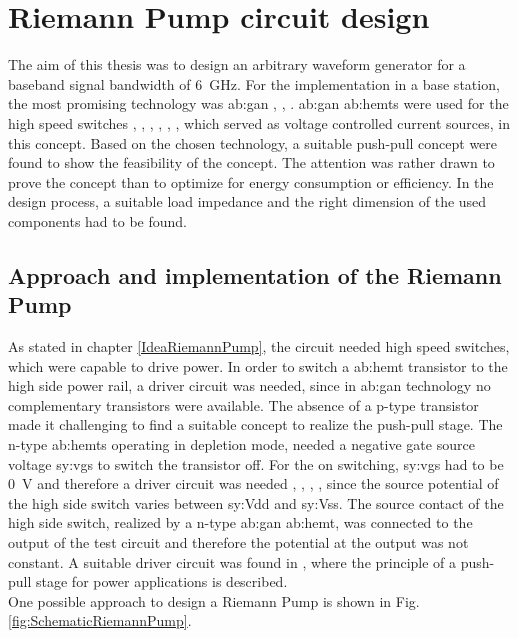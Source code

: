 \chapter{Riemann Pump circuit design}
\label{ch:design}
The aim of this thesis was to design an arbitrary waveform generator for a baseband signal bandwidth of \SI{6}{\giga \hertz}.
For the implementation in a base station, the most promising technology was \gls{ab:gan} \cite{EvertsDasKeybusJ.EtAl2010}, \cite{PengellyWoodMilliganEtAl2012}, \cite{SchmidReberChartierEtAl2011}.
\gls{ab:gan} \glspl{ab:hemt} were used for the high speed switches  \cite{MaroldtHauptKieferEtAl2009}, \cite{HongMukaiGheidiEtAl2013}, \cite{MaroldtBruecknerQuayEtAl2014}, \cite{WentzelMelianiHeinrich2010}, \cite{MaroldtQuayHauptEtAl2011}, \cite{QuayMaroldt2011}, which served as voltage controlled current sources, in this concept.
Based on the chosen technology, a suitable push-pull concept were found \cite{MaksimovicPaper} to show the feasibility of the concept.
The attention was rather drawn to prove the concept than to optimize for energy consumption or efficiency.
In the design process, a suitable load impedance and the right dimension of the used components had to be found.

\section{Approach and implementation of the Riemann Pump}
As stated in chapter \ref{IdeaRiemannPump}, the circuit needed high speed switches, which were capable to drive power.
In order to switch a \gls{ab:hemt} transistor to the high side power rail, a driver circuit was needed, since in \gls{ab:gan} technology no complementary transistors were available.
The absence of a p-type transistor made it challenging to find a suitable concept to realize the push-pull stage.
The n-type \glspl{ab:hemt} operating in depletion mode, needed a negative gate source voltage \gls{sy:vgs} to switch the transistor off.
For the on switching, \gls{sy:vgs} had to be \SI{0}{\volt} and therefore a driver circuit was needed \cite{Y.Zhang2015}, \cite{MaksimovicPaper}, \cite{GhoshAltmannKerstenEtAl2014}, \cite{HongMukaiGheidiEtAl2013}, since the source potential of the high side switch varies between \gls{sy:Vdd} and \gls{sy:Vss}.
The source contact of the high side switch, realized by a n-type \gls{ab:gan} \gls{ab:hemt}, was connected to the output of the test circuit and therefore the potential at the output was not constant.
A suitable driver circuit was found in \cite{MaksimovicPaper}, where the principle of a push-pull stage for power applications is described.\\
One possible approach to design a Riemann Pump is shown in Fig. \ref{fig:SchematicRiemannPump}.


